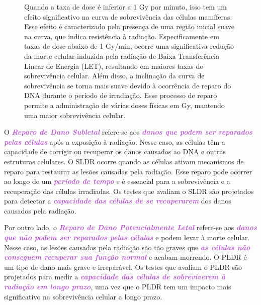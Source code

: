 \documentclass[11pt,a4paper]{article}
\begin{document}
	\begin{figure}[h]
		\centering
		\caption{Quando a taxa de dose é inferior a 1 Gy por minuto, isso tem um efeito significativo na curva de sobrevivência das células mamíferas. Esse efeito é caracterizado pela presença de uma região inicial suave na curva, que indica resistência à radiação. Especificamente em taxas de dose abaixo de 1 Gy/min, ocorre uma significativa redução da morte celular induzida pela radiação de Baixa Transferência Linear de Energia (LET), resultando em maiores taxas de sobrevivência celular. Além disso, a inclinação da curva de sobrevivência se torna mais suave devido à ocorrência de reparo do DNA durante o período de irradiação. Esse processo de reparo permite a administração de várias doses físicas em Gy, mantendo uma maior sobrevivência celular.}
		\label{fig:reparoDanosPontenciais}
	\end{figure}

	O \textcolor{MediumOrchid}{\textbf{\textit{Reparo de Dano Subletal}}} refere-se aos \textcolor{MediumOrchid}{\textbf{\textit{danos que podem ser reparados pelas células}}} após a exposição à radiação. Nesse caso, as células têm a capacidade de corrigir ou recuperar os danos causados ao DNA e outras estruturas celulares. O SLDR ocorre quando as células ativam mecanismos de reparo para restaurar as lesões causadas pela radiação. Esse reparo pode ocorrer ao longo de um \textcolor{MediumOrchid}{\textbf{\textit{período de tempo}}} e é essencial para a sobrevivência e a recuperação das células irradiadas. Os testes que avaliam o SLDR são projetados para detectar a \textcolor{MediumOrchid}{\textbf{\textit{capacidade das células de se recuperarem}}} dos danos causados pela radiação.

	Por outro lado, o \textcolor{MediumOrchid}{\textbf{\textit{Reparo de Dano Potencialmente Letal}}} refere-se aos \textcolor{MediumOrchid}{\textbf{\textit{danos que não podem ser reparados pelas células}}} e podem levar à morte celular. Nesse caso, as lesões causadas pela radiação são tão graves que \textcolor{MediumOrchid}{\textbf{\textit{as células não conseguem recuperar sua função normal}}} e acabam morrendo. O PLDR é um tipo de dano mais grave e irreparável. Os testes que avaliam o PLDR são projetados para medir a \textcolor{MediumOrchid}{\textbf{\textit{capacidade das células de sobreviverem à radiação em longo prazo}}}, uma vez que o PLDR tem um impacto mais significativo na sobrevivência celular a longo prazo.
\end{document}
